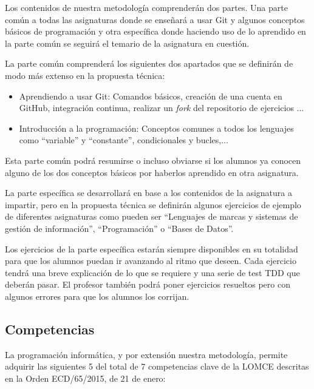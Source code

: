 Los contenidos de nuestra metodología comprenderán dos partes. Una parte común a todas las asignaturas donde se enseñará a usar Git y algunos conceptos básicos de programación y otra específica donde haciendo uso de lo aprendido en la parte común se seguirá el temario de la asignatura en cuestión.


\bigskip
La parte común comprenderá los siguientes dos apartados que se definirán de modo más extenso en la propuesta técnica:

\begin{itemize}
    \item Aprendiendo a usar Git: Comandos básicos, creación de una cuenta en GitHub, integración continua, realizar un \textit{fork} del repositorio de ejercicios ...
    \item Introducción a la programación: Conceptos comunes a todos los lenguajes como ``variable'' y ``constante'', condicionales y bucles,...
\end{itemize}

Esta parte común podrá resumirse o incluso obviarse si los alumnos ya conocen alguno de los dos conceptos básicos por haberlos aprendido en otra asignatura.

\bigskip
La parte específica se desarrollará en base a los contenidos de la asignatura a impartir, pero en la propuesta técnica se definirán algunos ejercicios de ejemplo de diferentes asignaturas como pueden ser ``Lenguajes de marcas y sistemas de gestión de información'', ``Programación'' o ``Bases de Datos''.

\bigskip
Los ejercicios de la parte específica estarán siempre disponibles en su totalidad para que los alumnos puedan ir avanzando al ritmo que deseen. Cada ejercicio tendrá una breve explicación de lo que se requiere y una serie de test TDD que deberán pasar. El profesor también podrá poner ejercicios resueltos pero con algunos errores para que los alumnos los corrijan.

\subsection{Competencias}

La programación informática, y por extensión nuestra metodología, permite adquirir las siguientes 5 del total de 7 competencias clave de la LOMCE descritas en la Orden ECD/65/2015, de 21 de enero:

